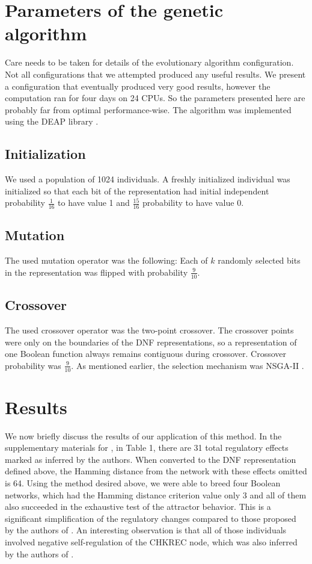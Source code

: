 \documentclass[a4paper,10pt]{article}
\begin{document}
\section{Parameters of the genetic algorithm}
Care needs to be taken for details of the evolutionary algorithm configuration.
Not all configurations that we attempted produced any useful results.
We present a configuration that eventually produced very good results,
however the computation ran for four days on 24 CPUs. So the parameters presented here
are probably far from optimal performance-wise. 
The algorithm was implemented using the DEAP library \cite{deap}.

\subsection{Initialization}
We used a population of 1024 individuals.
A freshly initialized individual was initialized so that each bit of the representation
had initial independent probability $\frac{1}{16}$ to have value 1 and $\frac{15}{16}$ probability to have value 0.

\subsection{Mutation}
The used mutation operator was the following: Each of $k$ randomly selected bits in the representation
was flipped with probability $\frac{9}{10}$.

\subsection{Crossover}
The used crossover operator was the two-point crossover.
The crossover points were only on the boundaries of the DNF representations,
so a representation of one Boolean function always remains contiguous during crossover.
Crossover probability was $\frac{9}{10}$.
As mentioned earlier, the selection mechanism was NSGA-II \cite{nsga2}.

\section{Results}
We now briefly discuss the results of our application of this method.
In the supplementary materials for \cite{rodriguez1}, in Table 1,
there are 31 total regulatory effects marked as inferred by the authors.
When converted to the DNF representation defined above, the Hamming distance
from the network with these effects omitted is 64. 
Using the method desired above, we were able to breed four Boolean networks,
which had the Hamming distance criterion value only 3 and all of them
also succeeded in the exhaustive test of the attractor behavior.
This is a significant simplification of the regulatory changes 
compared to those proposed by the authors of \cite{rodriguez1}.
An interesting observation is that all of those individuals involved
negative self-regulation of the CHKREC node, which was also inferred 
by the authors of \cite{rodriguez1}.

{}

\end{document}
